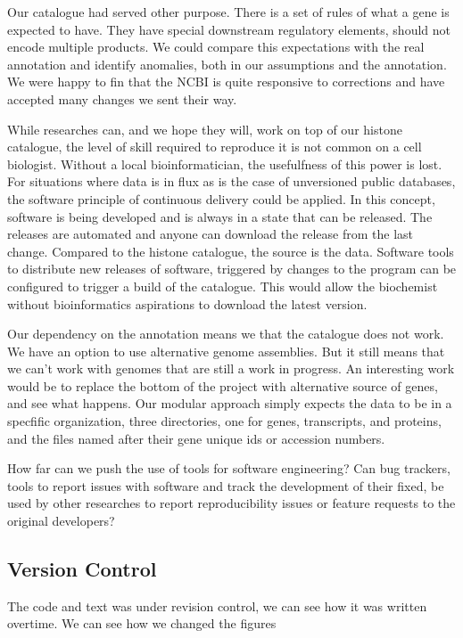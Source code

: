 Our catalogue had served other purpose.  There is a set of rules of
what a gene is expected to have.  They have special downstream
regulatory elements, should not encode multiple products.  We could
compare this expectations with the real annotation and identify
anomalies, both in our assumptions and the annotation.  We were happy
to fin that the NCBI is quite responsive to corrections and have
accepted many changes we sent their way.

While researches can, and we hope they will, work on top of our
histone catalogue, the level of skill required to reproduce it is not
common on a cell biologist.  Without a local bioinformatician, the
usefulfness of this power is lost.  For situations where data is in
flux as is the case of unversioned public databases, the software
principle of continuous delivery could be applied.  In this concept,
software is being developed and is always in a state that can be
released.  The releases are automated and anyone can download the
release from the last change.  Compared to the histone catalogue, the
source is the data.  Software tools to distribute new releases of
software, triggered by changes to the program can be configured to
trigger a build of the catalogue.  This would allow the biochemist
without bioinformatics aspirations to download the latest version.

Our dependency on the annotation means we that the catalogue does not
work.  We have an option to use alternative genome assemblies. But it
still means that we can't work with genomes that are still a work in
progress.  An interesting work would be to replace the bottom of the
project with alternative source of genes, and see what happens.  Our
modular approach simply expects the data to be in a specfific
organization, three directories, one for genes, transcripts, and
proteins, and the files named after their gene unique ids or accession
numbers.

How far can we push the use of tools for software engineering?  Can
bug trackers, tools to report issues with software and track the
development of their fixed, be used by other researches to report
reproducibility issues or feature requests to the original developers?



\subsection{Version Control}
The code and text was under revision control, we can see how it was
written overtime.  We can see how we changed the figures

